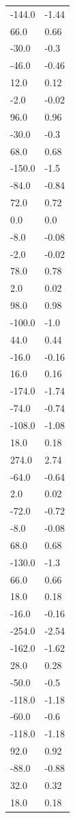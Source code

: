 \begin{longtable}{ll}
-144.0 & -1.44 \\
66.0 & 0.66 \\
-30.0 & -0.3 \\
-46.0 & -0.46 \\
12.0 & 0.12 \\
-2.0 & -0.02 \\
96.0 & 0.96 \\
-30.0 & -0.3 \\
68.0 & 0.68 \\
-150.0 & -1.5 \\
-84.0 & -0.84 \\
72.0 & 0.72 \\
0.0 & 0.0 \\
-8.0 & -0.08 \\
-2.0 & -0.02 \\
78.0 & 0.78 \\
2.0 & 0.02 \\
98.0 & 0.98 \\
-100.0 & -1.0 \\
44.0 & 0.44 \\
-16.0 & -0.16 \\
16.0 & 0.16 \\
-174.0 & -1.74 \\
-74.0 & -0.74 \\
-108.0 & -1.08 \\
18.0 & 0.18 \\
274.0 & 2.74 \\
-64.0 & -0.64 \\
2.0 & 0.02 \\
-72.0 & -0.72 \\
-8.0 & -0.08 \\
68.0 & 0.68 \\
-130.0 & -1.3 \\
66.0 & 0.66 \\
18.0 & 0.18 \\
-16.0 & -0.16 \\
-254.0 & -2.54 \\
-162.0 & -1.62 \\
28.0 & 0.28 \\
-50.0 & -0.5 \\
-118.0 & -1.18 \\
-60.0 & -0.6 \\
-118.0 & -1.18 \\
92.0 & 0.92 \\
-88.0 & -0.88 \\
32.0 & 0.32 \\
18.0 & 0.18 \\

\end{longtable}
